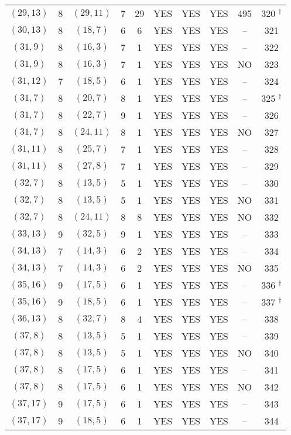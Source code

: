 \begin{longtable}{|c|c|c|c|c|c|c|c|c|c|}
$(29, 13)$ & 8 & $(29, 11)$ & 7 & 29 & YES & YES & YES & 495 & 320 ${}^\dagger$\\
$(30, 13)$ & 8 & $(18, 7)$ & 6 & 6 & YES & YES & YES & -- & 321\\
$(31, 9)$ & 8 & $(16, 3)$ & 7 & 1 & YES & YES & YES & -- & 322\\
$(31, 9)$ & 8 & $(16, 3)$ & 7 & 1 & YES & YES & YES & NO & 323\\
$(31, 12)$ & 7 & $(18, 5)$ & 6 & 1 & YES & YES & YES & -- & 324\\
$(31, 7)$ & 8 & $(20, 7)$ & 8 & 1 & YES & YES & YES & -- & 325 ${}^\dagger$\\
$(31, 7)$ & 8 & $(22, 7)$ & 9 & 1 & YES & YES & YES & -- & 326\\
$(31, 7)$ & 8 & $(24, 11)$ & 8 & 1 & YES & YES & YES & NO & 327\\
$(31, 11)$ & 8 & $(25, 7)$ & 7 & 1 & YES & YES & YES & -- & 328\\
$(31, 11)$ & 8 & $(27, 8)$ & 7 & 1 & YES & YES & YES & -- & 329\\
$(32, 7)$ & 8 & $(13, 5)$ & 5 & 1 & YES & YES & YES & -- & 330\\
$(32, 7)$ & 8 & $(13, 5)$ & 5 & 1 & YES & YES & YES & NO & 331\\
$(32, 7)$ & 8 & $(24, 11)$ & 8 & 8 & YES & YES & YES & NO & 332\\
$(33, 13)$ & 9 & $(32, 5)$ & 9 & 1 & YES & YES & YES & -- & 333\\
$(34, 13)$ & 7 & $(14, 3)$ & 6 & 2 & YES & YES & YES & -- & 334\\
$(34, 13)$ & 7 & $(14, 3)$ & 6 & 2 & YES & YES & YES & NO & 335\\
$(35, 16)$ & 9 & $(17, 5)$ & 6 & 1 & YES & YES & YES & -- & 336 ${}^\dagger$\\
$(35, 16)$ & 9 & $(18, 5)$ & 6 & 1 & YES & YES & YES & -- & 337 ${}^\dagger$\\
$(36, 13)$ & 8 & $(32, 7)$ & 8 & 4 & YES & YES & YES & -- & 338\\
$(37, 8)$ & 8 & $(13, 5)$ & 5 & 1 & YES & YES & YES & -- & 339\\
$(37, 8)$ & 8 & $(13, 5)$ & 5 & 1 & YES & YES & YES & NO & 340\\
$(37, 8)$ & 8 & $(17, 5)$ & 6 & 1 & YES & YES & YES & -- & 341\\
$(37, 8)$ & 8 & $(17, 5)$ & 6 & 1 & YES & YES & YES & NO & 342\\
$(37, 17)$ & 9 & $(17, 5)$ & 6 & 1 & YES & YES & YES & -- & 343\\
$(37, 17)$ & 9 & $(18, 5)$ & 6 & 1 & YES & YES & YES & -- & 344\\

\end{longtable}
